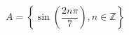 \documentclass[preview]{standalone}
\begin{document}
\begin{center}
\(A = \left\{\sin\left(\dfrac{2n\pi}{7}\right), n\in\mathbb{Z}\right\}\)
\end{center}
\end{document}
